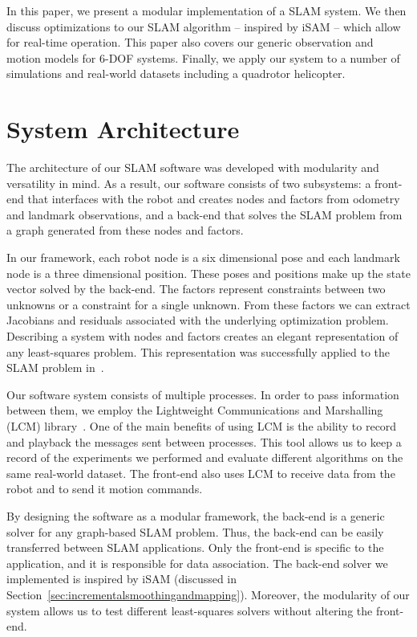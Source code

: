 \documentclass[conference]{IEEEtran}
\begin{document}
In this paper, we present a modular implementation of a \ac{SLAM} system. We then discuss
optimizations to our SLAM algorithm -- inspired by iSAM -- which allow for real-time
operation. This paper also covers our generic observation and motion models for 6-\ac{DOF}
systems. Finally, we apply our system to a number of simulations and real-world datasets
including a quadrotor helicopter.



\section{System Architecture}
\label{sec:systemarchitecture}


The architecture of our \ac{SLAM} software was developed with modularity and versatility
in mind.  As a result, our software consists of two subsystems: a
front-end that interfaces with the robot and creates nodes and factors from
odometry and landmark observations, and a back-end that solves the \ac{SLAM} problem from
a graph generated from these nodes and factors.

In our framework, each robot node is a six dimensional pose and each landmark node is a
three dimensional position. These poses and positions make up the state vector solved by
the back-end. The factors represent constraints between two unknowns or a constraint for a
single unknown. From these factors we can extract Jacobians and residuals associated with
the underlying optimization problem. Describing a system with nodes and factors creates
an elegant representation of any least-squares problem. This representation was
successfully applied to the \ac{SLAM} problem in~\cite{dellaert2005square}.


Our software system consists of multiple processes. In order to pass information between
them, we employ the Lightweight Communications and Marshalling (LCM)
library~\cite{huang2010}. One of the main benefits of using LCM is the ability to record
and playback the messages sent between processes. This tool allows us to keep a record of
the experiments we performed and evaluate different algorithms on the same
real-world dataset. The front-end also uses LCM to receive data from the robot and to send
it motion commands.

By designing the software as a modular framework, the back-end is a generic solver for any
graph-based \ac{SLAM} problem. Thus, the back-end can be easily transferred between
\ac{SLAM} applications. Only the front-end is specific to the application, and it is
responsible for data association. The back-end solver we implemented is inspired by iSAM
(discussed in Section~\ref{sec:incrementalsmoothingandmapping}). Moreover, the modularity
of our system allows us to test different least-squares solvers without altering the
front-end.
\end{document}
